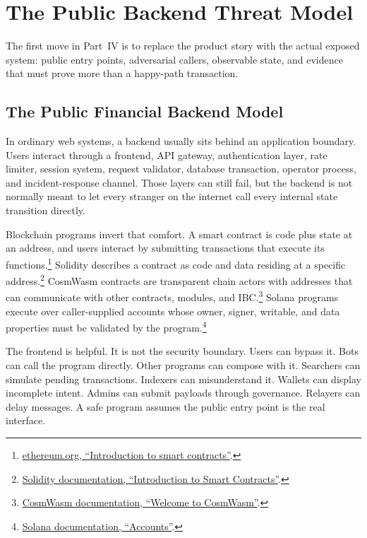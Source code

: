 \section{The Public Backend Threat Model}

The first move in Part~IV is to replace the product story with the actual exposed system: public entry points, adversarial callers, observable state, and evidence that must prove more than a happy-path transaction.

\subsection{The Public Financial Backend Model}

In ordinary web systems, a backend usually sits behind an application boundary. Users interact through a frontend, API gateway, authentication layer, rate limiter, session system, request validator, database transaction, operator process, and incident-response channel. Those layers can still fail, but the backend is not normally meant to let every stranger on the internet call every internal state transition directly.

Blockchain programs invert that comfort. A smart contract is code plus state at an address, and users interact by submitting transactions that execute its functions.\footnote{\href{https://ethereum.org/developers/docs/smart-contracts/}{ethereum.org, ``Introduction to smart contracts''}.} Solidity describes a contract as code and data residing at a specific address.\footnote{\href{https://docs.soliditylang.org/en/latest/introduction-to-smart-contracts.html}{Solidity documentation, ``Introduction to Smart Contracts''}.} CosmWasm contracts are transparent chain actors with addresses that can communicate with other contracts, modules, and IBC.\footnote{\href{https://cosmwasm.github.io/}{CosmWasm documentation, ``Welcome to CosmWasm''}.} Solana programs execute over caller-supplied accounts whose owner, signer, writable, and data properties must be validated by the program.\footnote{\href{https://solana.com/docs/core/accounts}{Solana documentation, ``Accounts''}.}

The frontend is helpful. It is not the security boundary. Users can bypass it. Bots can call the program directly. Other programs can compose with it. Searchers can simulate pending transactions. Indexers can misunderstand it. Wallets can display incomplete intent. Admins can submit payloads through governance. Relayers can delay messages. A safe program assumes the public entry point is the real interface.

